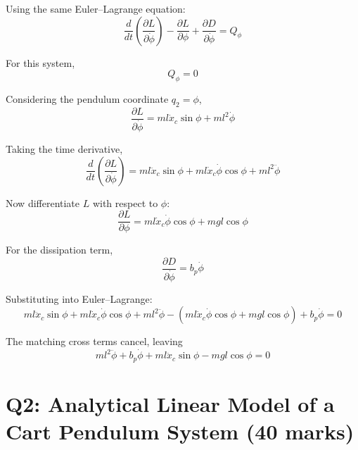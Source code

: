 \documentclass[11pt,a4paper]{article}
\begin{document}
Using the same Euler--Lagrange equation:
\begin{equation*}
	\frac{d}{dt} \left( \frac{\partial L}{\partial \dot{\phi}} \right)
	- \frac{\partial L}{\partial \phi}
	+ \frac{\partial D}{\partial \dot{\phi}} = Q_{\phi}
\end{equation*}

For this system,
\begin{equation*}
	Q_{\phi} = 0
\end{equation*}

Considering the pendulum coordinate $q_{2} = \phi$,
\begin{equation*}
	\frac{\partial L}{\partial \dot{\phi}}
	= m l \dot{x}_{c} \sin\phi + m l^{2} \dot{\phi}
\end{equation*}

Taking the time derivative,
\begin{equation*}
	\frac{d}{dt} \left( \frac{\partial L}{\partial \dot{\phi}} \right)
	= m l \ddot{x}_{c} \sin\phi
	+ m l \dot{x}_{c} \dot{\phi} \cos\phi
	+ m l^{2} \ddot{\phi}
\end{equation*}

Now differentiate $L$ with respect to $\phi$:
\begin{equation*}
	\frac{\partial L}{\partial \phi}
	= m l \dot{x}_{c} \dot{\phi} \cos\phi + m g l \cos\phi
\end{equation*}

For the dissipation term,
\begin{equation*}
	\frac{\partial D}{\partial \dot{\phi}} = b_{p} \dot{\phi}
\end{equation*}

Substituting into Euler--Lagrange:
\begin{equation*}
	m l \ddot{x}_{c} \sin\phi
	+ m l \dot{x}_{c} \dot{\phi} \cos\phi
	+ m l^{2} \ddot{\phi}
	- \left( m l \dot{x}_{c} \dot{\phi} \cos\phi + m g l \cos\phi \right)
	+ b_{p} \dot{\phi} = 0
\end{equation*}

The matching cross terms cancel, leaving
\begin{equation*}
	\boxed{\;
		m l^{2} \ddot{\phi} + b_{p} \dot{\phi}
		+ m l \ddot{x}_{c} \sin\phi - m g l \cos\phi = 0
		\;} \tag{1b}
\end{equation*}

\section*{Q2: Analytical Linear Model of a Cart Pendulum System
	\hfill (40 marks)}
\end{document}
